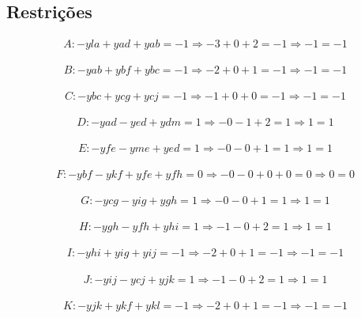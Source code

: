 \documentclass[a4paper]{report}
\begin{document}
\subsection{Restrições}
\begin{multline}
A: - yla + yad + yab = -1
\Rightarrow - 3 + 0 + 2 = -1 
\Rightarrow -1 = -1
\end{multline}

\begin{multline}
B: - yab + ybf + ybc = -1
\Rightarrow - 2 + 0 + 1 = -1
\Rightarrow -1 = -1
\end{multline}

\begin{multline}
C: - ybc + ycg + ycj = -1
\Rightarrow - 1 + 0 + 0 = -1
\Rightarrow -1 = -1
\end{multline}

\begin{multline}
D: - yad - yed + ydm = 1
\Rightarrow - 0 - 1 + 2 = 1
\Rightarrow 1 = 1
\end{multline}

\begin{multline}
E: - yfe - yme + yed = 1
\Rightarrow - 0 - 0 + 1 = 1
\Rightarrow 1 = 1
\end{multline}

\begin{multline}
F: - ybf - ykf + yfe + yfh = 0
\Rightarrow - 0 - 0 + 0 + 0 = 0
\Rightarrow 0 = 0
\end{multline}

\begin{multline}
G: - ycg - yig + ygh = 1
\Rightarrow - 0 - 0 + 1 = 1
\Rightarrow 1 = 1
\end{multline}

\begin{multline}
H: - ygh - yfh + yhi = 1
\Rightarrow - 1 - 0 + 2 = 1
\Rightarrow 1 = 1
\end{multline}

\begin{multline}
I: - yhi + yig + yij = -1
\Rightarrow - 2 + 0 + 1 = -1
\Rightarrow -1 = -1
\end{multline}

\begin{multline}
J: - yij - ycj + yjk = 1
\Rightarrow - 1 - 0 + 2 = 1
\Rightarrow 1 = 1
\end{multline}

\begin{multline}
K: - yjk + ykf + ykl = -1
\Rightarrow - 2 + 0 + 1 = -1
\Rightarrow -1 = -1
\end{multline}
\end{document}

